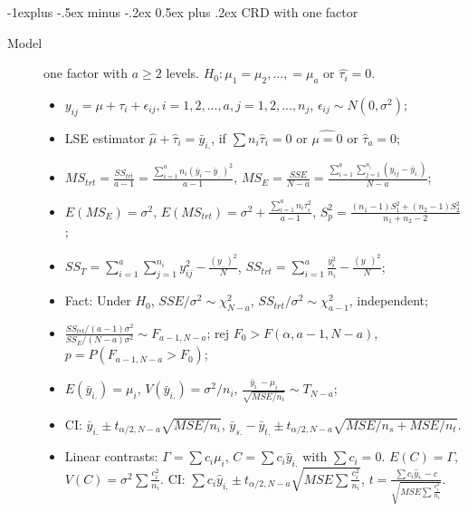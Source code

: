 \documentclass[10pt,landscape]{article}
\makeatletter
\renewcommand{\subsection}{\@startsection{subsection}{2}{0mm}%
                                {-1explus -.5ex minus -.2ex}%
                                {0.5ex plus .2ex}%
                                {\normalfont\normalsize\bfseries}}
\makeatother
\begin{document}
\begin{multicols}{3}
\subsection{CRD with one factor}
\begin{description}
    \item[Model] one factor with $a\geq 2$ levels. $H_0: \mu_1 = \mu_2, ..., = \mu_a$ or $\hat{\tau_i} = 0$.
    \begin{itemize}
         \item $y_{ij} = \mu + \tau_i + \epsilon_{ij}, i=1,2,...,a, j=1,2,...,n_j$, $\epsilon_{ij}\sim N(0,\sigma^2)$;
    		\item LSE estimator $\hat{\mu} + \hat{\tau}_i = \bar{y}_{i.}$,  if $\sum n_i\hat{\tau}_i = 0$ or $\hat{\mu = 0}$ or $\hat{\tau}_a=0$;
    		\item $MS_{trt} = \frac{SS_{trt}}{a-1} =\frac{\sum_{i=1}^a n_i (\bar{y}_i - \bar{y}_{..})^2}{a-1}$, $MS_E = \frac{SSE}{N-a} = \frac{\sum_{i=1}^a \sum_{j=1}^{n_i} (y_{ij} - \bar{y}_{i.})}{N-a}$;
    		\item $E(MS_E)=\sigma^2$, $E(MS_{trt}) = \sigma^2 + \frac{\sum_{i=1}^a n_i \tau_i^2}{a-1}$, $S_p^2 = \frac{(n_1-1)S_1^2 + (n_2-1)S_2^2}{n_1+n_2-2}$;
    		\item $SS_T = \sum_{i=1}^a \sum_{j=1}^{n_i} y_{ij}^2 - \frac{(y_{..})^2}{N}$, $SS_{trt} = \sum_{i=1}^a \frac{y_i^2}{n_i} - \frac{(y_{..})^2}{N}$;
    		\item Fact: Under $H_0$, $SSE/\sigma^2 \sim \chi_{N-a}^2$, $SS_{trt}/\sigma^2 \sim \chi_{a-1}^2$, independent;
    		\item $\frac{SS_{trt}/(a-1)\sigma^2}{SS_{E}/(N-a)\sigma^2} \sim F_{a-1, N-a}$; rej  $F_0 > F(\alpha, a-1, N-a)$,  $p = P(F_{a-1, N-a} > F_0)$;
    		\item $E(\bar{y}_{i.}) = \mu_i$, $V(\bar{y}_{i.})=\sigma^2/n_i$, $\frac{\bar{y}_{i.} - \mu_i}{\sqrt{MSE/n_i}}\sim T_{N-a}$;
    		\item CI: $\bar{y}_{i.} \pm t_{\alpha /2, N-a}\sqrt{MSE/n_i}$, $\bar{y}_{s.} - \bar{y}_{t.} \pm t_{\alpha /2, N-a}\sqrt{MSE/n_s+MSE/n_t}$.
    		\item Linear contrasts: $\Gamma = \sum c_i\mu_i$, $C = \sum c_i\hat{y}_{i.}$ with $\sum c_i = 0$. $E(C)=\Gamma$, $V(C) = \sigma^2\sum \frac{c_i^2}{n_i}$. CI: $\sum c_i\hat{y}_{i.} \pm t_{\alpha /2, N-a}\sqrt{MSE\sum \frac{c_i^2}{n_i}}$, $t=\frac{\sum c_i\hat{y}_{i.} - c}{\sqrt{MSE\sum \frac{c_i^2}{n_i}}}$.
    \end{itemize}
    \end{description}
    

\end{multicols}
\end{document}
